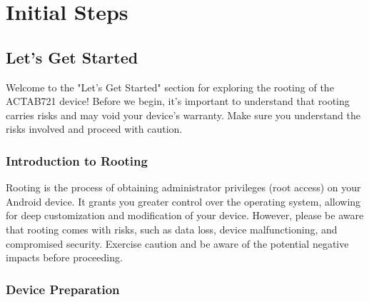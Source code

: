 {\color{teal}\chapter{Initial Steps}\label{cap:dpa}}

\minitoc


\section{Let's Get Started}{\faCaretRight}
Welcome to the "Let's Get Started" section for exploring the rooting of the ACTAB721 device! Before we begin, it's important to understand that rooting carries risks and may void your device's warranty. Make sure you understand the risks involved and proceed with caution.

\subsection{Introduction to Rooting}

Rooting is the process of obtaining administrator privileges (root access) on your Android device. It grants you greater control over the operating system, allowing for deep customization and modification of your device. However, please be aware that rooting comes with risks, such as data loss, device malfunctioning, and compromised security. Exercise caution and be aware of the potential negative impacts before proceeding.

\subsection{Device Preparation}

